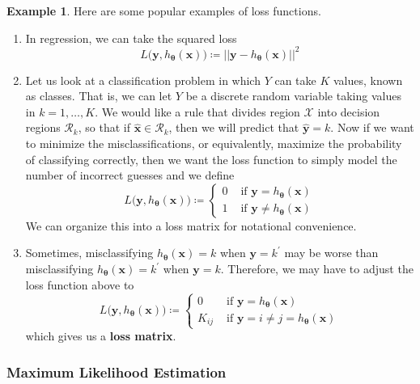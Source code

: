 \documentclass{article}
\theoremstyle{definition}
\newtheorem{example}{Example}[section]
\begin{document}
    \begin{example}
    Here are some popular examples of loss functions. 
    \begin{enumerate}
        \item In regression, we can take the squared loss
        \[L\big( \mathbf{y}, h_{\boldsymbol{\theta}} (\mathbf{x}) \big) \coloneqq || \mathbf{y} - h_{\boldsymbol{\theta}} (\mathbf{x}) ||^2\] 

        \item Let us look at a classification problem in which $Y$ can take $K$ values, known as classes. That is, we can let $Y$ be a discrete random variable taking values in $k = 1, \ldots, K$. We would like a rule that divides region $\mathcal{X}$ into decision regions $\mathcal{R}_k$, so that if $\hat{\mathbf{x}} \in \mathcal{R}_k$, then we will predict that $\hat{\mathbf{y}} = k$. Now if we want to minimize the misclassifications, or equivalently, maximize the probability of classifying correctly, then we want the loss function to simply model the number of incorrect guesses and we define 
        \[L\big( \mathbf{y}, h_{\boldsymbol{\theta}} (\mathbf{x}) \big) \coloneqq \begin{cases} 0 & \text{ if } \mathbf{y} = h_{\boldsymbol{\theta}} (\mathbf{x}) \\ 1 & \text{ if } \mathbf{y} \neq h_{\boldsymbol{\theta}} (\mathbf{x}) \end{cases}\]
        We can organize this into a loss matrix for notational convenience.  

        \item Sometimes, misclassifying $h_{\boldsymbol{\theta}} (\mathbf{x}) = k$ when $\mathbf{y} = k^\prime$ may be worse than misclassifying $h_{\boldsymbol{\theta}} (\mathbf{x}) = k^\prime$ when $\mathbf{y} = k$. Therefore, we may have to adjust the loss function above to 
        \[L\big( \mathbf{y}, h_{\boldsymbol{\theta}} (\mathbf{x}) \big) \coloneqq \begin{cases} 0 & \text{ if } \mathbf{y} = h_{\boldsymbol{\theta}} (\mathbf{x}) \\ K_{ij} & \text{ if } \mathbf{y} = i \neq j = h_{\boldsymbol{\theta}} (\mathbf{x})\end{cases}\]
        which gives us a \textbf{loss matrix}. 
    \end{enumerate}
    \end{example}

    \subsubsection{Maximum Likelihood Estimation}
\end{document}
